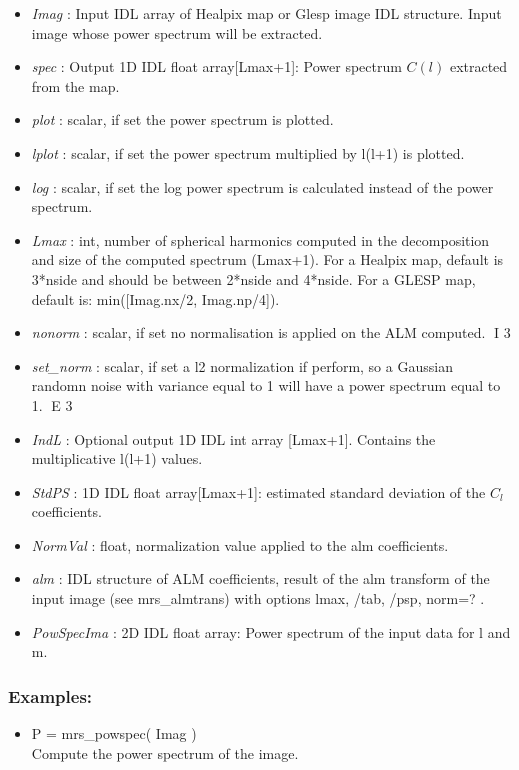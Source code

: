 \begin{itemize}
\item {\em Imag} : Input IDL array of Healpix map or Glesp image IDL structure. Input image whose power spectrum will be extracted.
\item {\em spec} : Output 1D IDL float array[Lmax+1]: Power spectrum $C(l)$ extracted from the map.
\item {\em plot} : scalar, if set the power spectrum is plotted.
\item {\em lplot} : scalar, if set the power spectrum multiplied by l(l+1) is plotted.
\item {\em log} : scalar, if set the log power spectrum is calculated instead of the power spectrum.
\item {\em Lmax} : int, number of spherical harmonics computed in the decomposition and size of the computed spectrum (Lmax+1). 
For a Healpix map, default is 3*nside and should be between 2*nside and 4*nside. For a GLESP map, default is: min([Imag.nx/2, Imag.np/4]).
\item {\em nonorm} : scalar, if set no normalisation is applied on the ALM computed.
I 3
\item {\em set\_norm} : scalar, if set a l2 normalization if perform, so a Gaussian randomn noise with variance equal to 1 will have a power spectrum equal to 1.
E 3
\item {\em IndL} : Optional output 1D IDL int array [Lmax+1]. Contains the multiplicative l(l+1) values.
\item {\em StdPS} : 1D IDL float array[Lmax+1]: estimated standard deviation of the $C_l$ coefficients.
\item {\em NormVal} : float, normalization value applied to the alm coefficients.
\item {\em alm} : IDL structure of ALM coefficients, result of the alm transform of the input image (see mrs\_almtrans) with options lmax, /tab, /psp, norm=? .
\item {\em PowSpecIma} : 2D IDL float array: Power spectrum of the input data for l and m.
\end{itemize}

\subsubsection*{Examples:} 
\begin{itemize}
\item P = mrs\_powspec( Imag ) \\
Compute the power spectrum of the image.
\end{itemize}



